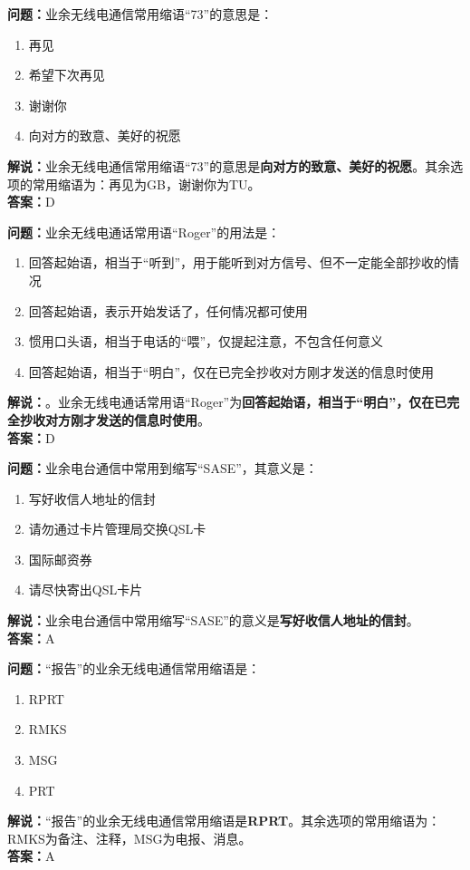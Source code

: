 \bigskip


\noindent\textbf{问题：}业余无线电通信常用缩语“73”的意思是：
\begin{enumerate}[label=\Alph*), leftmargin=3em]
\item 再见
\item 希望下次再见
\item 谢谢你
\item 向对方的致意、美好的祝愿
\end{enumerate}
\noindent\textbf{解说：}业余无线电通信常用缩语“73”的意思是\textbf{向对方的致意、美好的祝愿}。其余选项的常用缩语为：再见为GB，谢谢你为TU。\\\noindent\textbf{答案：}D



\bigskip


\noindent\textbf{问题：}业余无线电通话常用语“Roger”的用法是：
\begin{enumerate}[label=\Alph*), leftmargin=3em]
\item 回答起始语，相当于“听到”，用于能听到对方信号、但不一定能全部抄收的情况
\item 回答起始语，表示开始发话了，任何情况都可使用
\item 惯用口头语，相当于电话的“喂”，仅提起注意，不包含任何意义
\item 回答起始语，相当于“明白”，仅在已完全抄收对方刚才发送的信息时使用
\end{enumerate}
\noindent\textbf{解说：}。业余无线电通话常用语“Roger”为\textbf{回答起始语，相当于“明白”，仅在已完全抄收对方刚才发送的信息时使用}。\\\noindent\textbf{答案：}D


\bigskip


\noindent\textbf{问题：}业余电台通信中常用到缩写“SASE”，其意义是：
\begin{enumerate}[label=\Alph*), leftmargin=3em]
\item 写好收信人地址的信封
\item 请勿通过卡片管理局交换QSL卡
\item 国际邮资券
\item 请尽快寄出QSL卡片
\end{enumerate}
\noindent\textbf{解说：}业余电台通信中常用缩写“SASE”的意义是\textbf{写好收信人地址的信封}。\\\noindent\textbf{答案：}A



\bigskip


\noindent\textbf{问题：}“报告”的业余无线电通信常用缩语是：
\begin{enumerate}[label=\Alph*), leftmargin=3em]
\item RPRT
\item RMKS
\item MSG
\item PRT
\end{enumerate}
\noindent\textbf{解说：}“报告”的业余无线电通信常用缩语是\textbf{RPRT}。其余选项的常用缩语为：RMKS为备注、注释，MSG为电报、消息。\\\noindent\textbf{答案：}A





